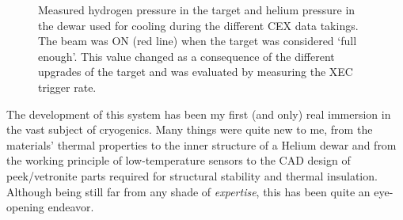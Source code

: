 \begin{refsection}
\begin{figure}[ht]
        \caption{Measured hydrogen pressure in the target and helium pressure in the dewar used for cooling during the different CEX data takings. 
        The beam was ON (red line) when the target was considered `full enough'. This value changed as a consequence of the different upgrades of the target and was evaluated by measuring the XEC trigger rate.}
        \label{fig:CEX:datataking}
    \end{figure}

    \noindent
    The development of this system has been my first (and only) real immersion in the vast subject of cryogenics. 
    Many things were quite new to me, from the materials' thermal properties to the inner structure of a Helium dewar and from the working principle of low-temperature sensors to the CAD design of peek/vetronite parts required for structural stability and thermal insulation.
    Although being still far from any shade of \textit{expertise}, this has been quite an eye-opening endeavor.
    
\printbibliography[
    heading = bibliographychapter,
    title=Bibliography on \ce{LH2}
]

\end{refsection}
